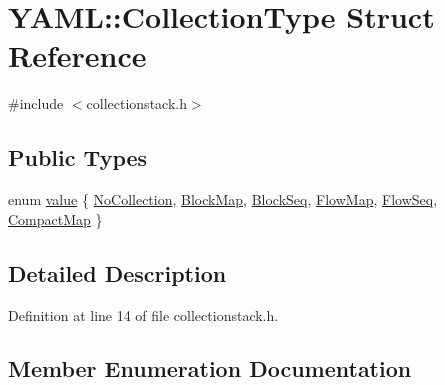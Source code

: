 \hypertarget{struct_y_a_m_l_1_1_collection_type}{}\section{Y\+A\+ML\+::Collection\+Type Struct Reference}
\label{struct_y_a_m_l_1_1_collection_type}


{\ttfamily \#include $<$collectionstack.\+h$>$}

\subsection*{Public Types}
\begin{DoxyCompactItemize}
\item 
enum \mbox{\hyperlink{struct_y_a_m_l_1_1_collection_type_a58f952b2cc7ebfe8423b5f50ed759bad}{value}} \{ \newline
\mbox{\hyperlink{struct_y_a_m_l_1_1_collection_type_a58f952b2cc7ebfe8423b5f50ed759bada46861d5425cef18bbf60c8ead2d9ce88}{No\+Collection}}, 
\mbox{\hyperlink{struct_y_a_m_l_1_1_collection_type_a58f952b2cc7ebfe8423b5f50ed759bada87d41e02dd64b0c69258bf1c6b98a050}{Block\+Map}}, 
\mbox{\hyperlink{struct_y_a_m_l_1_1_collection_type_a58f952b2cc7ebfe8423b5f50ed759badaa172da035542bead045a7840407dff36}{Block\+Seq}}, 
\mbox{\hyperlink{struct_y_a_m_l_1_1_collection_type_a58f952b2cc7ebfe8423b5f50ed759badadc0723d323aad874bde82fbfb6bcd2c7}{Flow\+Map}}, 
\newline
\mbox{\hyperlink{struct_y_a_m_l_1_1_collection_type_a58f952b2cc7ebfe8423b5f50ed759badaa36f9f61c00cdbd29552757a21f5642b}{Flow\+Seq}}, 
\mbox{\hyperlink{struct_y_a_m_l_1_1_collection_type_a58f952b2cc7ebfe8423b5f50ed759badabd99ac5038ed0b09395bfe9d5d8e47a5}{Compact\+Map}}
 \}
\end{DoxyCompactItemize}


\subsection{Detailed Description}


Definition at line 14 of file collectionstack.\+h.



\subsection{Member Enumeration Documentation}
\mbox{\label{struct_y_a_m_l_1_1_collection_type_a58f952b2cc7ebfe8423b5f50ed759bad}} 
